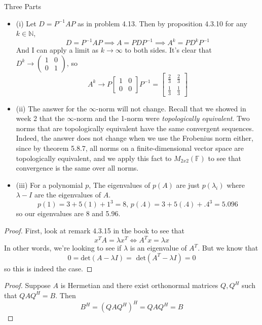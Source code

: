 \documentclass[12pt]{article}
\newenvironment{problem}[2][Problem]{\begin{trivlist}
\item[\hskip \labelsep {\bfseries #1}\hskip \labelsep {\bfseries #2.}]}{\end{trivlist}}
\theoremstyle{definition}
\theoremstyle{definition}
\theoremstyle{definition}
\theoremstyle{definition}
\begin{document}
\begin{problem}{4.16} Three Parts
\begin{itemize}
\item (i)
Let $D = P^{-1}AP$ as in problem 4.13. Then by proposition 4.3.10 for any $k \in \mathbb{N}$, 
$$
D = P^{-1}AP \implies A = PDP^{-1} \implies A^k = PD^kP^{-1}
$$
And I can apply a limit as $k \to \infty$ to both sides. It's clear that $D^k \to ( \begin{smallmatrix} 1 & 0 \\ 0 & 1 \end{smallmatrix} )$, so 
$$
A^k \to P \begin{bmatrix}
1 & 0 \\
0 & 0
\end{bmatrix} P^{-1} = \begin{bmatrix}
\frac{2}{3} & \frac{2}{3} \\
\frac{1}{3} & \frac{1}{3}
\end{bmatrix}
$$
\item (ii)
The answer for the $\infty$-norm will not change. Recall that we showed in week 2 that the $\infty$-norm and the 1-norm were \textit{topologically equivalent}. Two norms that are topologically equivalent have the same convergent sequences. Indeed, the answer does not change when we use the Frobenius norm either, since by theorem 5.8.7, all norms on a finite-dimensional vector space are topologically equivalent, and we apply this fact to $M_{2x2}(\mathbb{F})$ to see that convergence is the same over all norms.
\item (iii)
For a polynomial $p$, The eigenvalues of $p(A)$ are just $p(\lambda_i)$ where $\lambda-I$ are the eigenvalues of $A$.
$$
p(1) = 3 + 5(1) + 1^3 = 8\text{,  } p(.4) = 3 + 5(.4) +.4^3 = 5.096
$$
so our eigenvalues are 8 and 5.96.
\end{itemize}
\end{problem}

\begin{problem}{4.18}
\begin{proof}
First, look at remark 4.3.15 in the book to see that 
$$x^TA = \lambda x^T \iff A^Tx = \lambda x$$ 
In other words, we're looking to see if $\lambda$ is an eigenvalue of $A^T$. But we know that 
$$0 = \text{det}(A - \lambda I) = \text{ det}(A^T - \lambda I) = 0 $$ 
so this is indeed the case.
\end{proof}
\end{problem}

\begin{problem}{4.20}
\begin{proof}
Suppose $A$ is Hermetian and there exist orthonormal matrices $Q, Q^H$ such that $QAQ^H = B$. Then 
$$B^H = (QAQ^H)^H = QAQ^H = B$$
\end{proof}
\end{problem}
\end{document}
